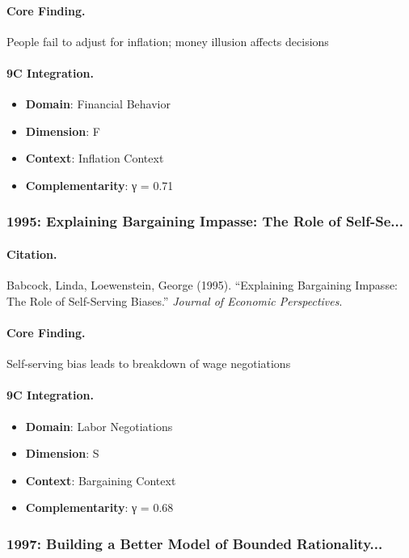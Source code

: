 \paragraph{Core Finding.}
People fail to adjust for inflation; money illusion affects decisions

\paragraph{9C Integration.}
\begin{itemize}[nosep]
  \item \textbf{Domain}: Financial Behavior
  \item \textbf{Dimension}: F
  \item \textbf{Context}: Inflation Context
  \item \textbf{Complementarity}: γ = 0.71
\end{itemize}

\subsubsection{1995: Explaining Bargaining Impasse: The Role of Self-Se...}

\paragraph{Citation.}
Babcock, Linda, Loewenstein, George (1995). ``Explaining Bargaining Impasse: The Role of Self-Serving Biases.''
\textit{Journal of Economic Perspectives}.

\paragraph{Core Finding.}
Self-serving bias leads to breakdown of wage negotiations

\paragraph{9C Integration.}
\begin{itemize}[nosep]
  \item \textbf{Domain}: Labor Negotiations
  \item \textbf{Dimension}: S
  \item \textbf{Context}: Bargaining Context
  \item \textbf{Complementarity}: γ = 0.68
\end{itemize}

\subsubsection{1997: Building a Better Model of Bounded Rationality...}

